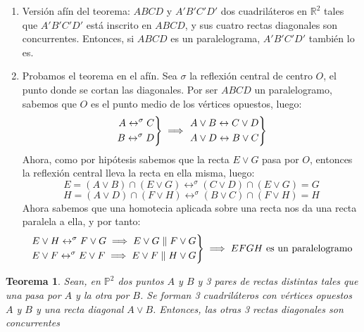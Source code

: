 \documentclass[11pt, a4paper]{article}
\makeatletter
\newif\IfInSansMode
\let\oldsf\sffamily
\renewcommand*{\sffamily}{\oldsf\mathversion{sans}\InSansModetrue}
\let\oldnorm\normalfont
\renewcommand*{\normalfont}{\oldnorm\InSansModefalse\mathversion{normal}}
\renewenvironment{proof}[1][\proofname] {\vspace{-15pt}\par\pushQED{\qed}\normalfont\topsep6\p@\@plus6\p@\relax\trivlist\item[\hskip\labelsep\it#1\@addpunct{.}]\ignorespaces}{\popQED\endtrivlist\@endpefalse}
\renewenvironment{proof}[1][\proofname] {\par\pushQED{\qed}\normalfont\topsep6\p@\@plus6\p@\relax\trivlist\item[\hskip\labelsep\itshape\sffamily#1\@addpunct{.}]\ignorespaces}{\popQED\endtrivlist\@endpefalse}
\theoremstyle{theorem-style}
\newtheorem{nth}{Teorema}[section]
\theoremstyle{definition-style}
\theoremstyle{remark-style}
\theoremstyle{example-style}
\newenvironment{nlist}
{\begin{enumerate}
    \renewcommand\labelenumi{(\emph{\roman{enumi})}}}
  {\end{enumerate}}
\newenvironment{rcases}
{\left.\begin{aligned}}
    {\end{aligned}\right\rbrace}
\makeatother
\begin{document}
\begin{proof} \hfill
	\begin{nlist}
	\item Versión afín del teorema: $ABCD$ y $A'B'C'D'$ dos cuadriláteros en $\mathbb{R}^2$ tales que $A'B'C'D'$ está inscrito en $ABCD$, y sus cuatro rectas diagonales son concurrentes. Entonces, si $ABCD$ es un paralelograma, $A'B'C'D'$ también lo es.
	\item Probamos el teorema en el afín. Sea $\sigma$ la reflexión central de centro $O$, el punto donde se cortan las diagonales. Por ser $ABCD$ un paralelogramo, sabemos que $O$ es el punto medio de los vértices opuestos, luego:
	\[
	\begin{rcases}
		A \leftrightarrow^\sigma C\\
		B \leftrightarrow^\sigma D		
\end{rcases} \implies 
	\begin{rcases}
		A\vee B \leftrightarrow C \vee D\\
		A \vee D \leftrightarrow B \vee C
\end{rcases}
\]
Ahora, como por hipótesis sabemos que la recta $E \vee G$ pasa por $O$, entonces la reflexión central lleva la recta en ella misma, luego:
$$E = (A \vee B) \cap (E \vee G) \leftrightarrow^\sigma (C \vee D) \cap (E \vee G) = G$$
$$H = (A \vee D) \cap (F \vee H) \leftrightarrow^\sigma (B \vee C) \cap (F \vee H) = H$$
Ahora sabemos que una homotecia aplicada sobre una recta nos da una recta paralela a ella, y por tanto:
\[
\begin{rcases}
	E\vee H \leftrightarrow^\sigma F \vee G \implies E \vee G \parallel F \vee G\\
	E\vee F \leftrightarrow^\sigma E \vee F \implies E \vee F \parallel H \vee G
\end{rcases} \implies EFGH \text{ es un paralelogramo}
\]
\end{nlist}
\end{proof}

\begin{nth}
Sean, en $\mathbb P^2$ dos puntos $A$ y $B$ y 3 pares de rectas distintas tales que una pasa por $A$ y la otra por $B$. Se forman 3 cuadriláteros con vértices opuestos $A$ y $B$ y una recta diagonal $A\vee B$. Entonces, las otras 3 rectas diagonales son concurrentes
\end{nth}
\end{document}
